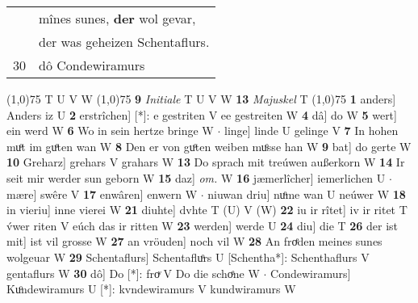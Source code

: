 \documentclass[8pt,a4paper,notitlepage]{article}
\begin{document}
\begin{table}[ht]
\begin{minipage}[t]{0.5\linewidth}
\begin{tabular}{rl}
 & mînes sunes, \textbf{der} wol gevar,\\ 
 & der was geheizen Schentaflurs.\\ 
30 & dô Condewiramurs \\ 
\end{tabular}
\scriptsize
\line(1,0){75} \newline
T U V W \newline
\line(1,0){75} \newline
\textbf{9} \textit{Initiale} T U V W  \textbf{13} \textit{Majuskel} T  \newline
\line(1,0){75} \newline
\textbf{1} anders] Anders iz U \textbf{2} erstrîchen] [*]: e gestriten V ee gestreiten W \textbf{4} dâ] do W \textbf{5} wert] ein werd W \textbf{6} Wo in sein hertze bringe W  $\cdot$ linge] linde U gelinge V \textbf{7} In hohen muͦt im guͦten wan W \textbf{8} Den er von guͦten weiben muͦsse han W \textbf{9} bat] do gerte W \textbf{10} Greharz] grehars V grahars W \textbf{13} Do sprach mit treúwen außerkorn W \textbf{14} Ir seit mir werder sun geborn W \textbf{15} daz] \textit{om.} W \textbf{16} jæmerlîcher] iemerlichen U  $\cdot$ mære] swêre V \textbf{17} enwâren] enwern W  $\cdot$ niuwan driu] nuͦme wan U neúwer W \textbf{18} in vieriu] inne vierei W \textbf{21} diuhte] dvhte T (U) V (W) \textbf{22} iu ir rîtet] iv ir ritet T v́wer riten V eúch das ir ritten W \textbf{23} werden] werde U \textbf{24} diu] die T \textbf{26} der ist mit] ist vil grosse W \textbf{27} an vröuden] noch vil W \textbf{28} An froͤden meines sunes wolgeuar W \textbf{29} Schentaflurs] Schentafluͦrs U [Schentha*]: Schenthaflurs V gentaflurs W \textbf{30} dô] Do [*]: froͮ V Do die schoͤne W  $\cdot$ Condewiramurs] Kuͦndewiramurs U [*]: kvndewiramurs V kundwiramurs W \newline
\end{minipage}
\end{table}
\end{document}
